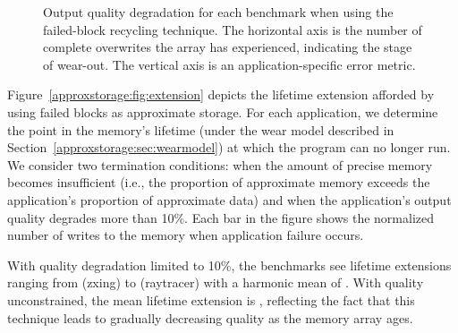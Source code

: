 \begin{figure}
    \centering
    \caption{
        Output quality degradation for each benchmark when using the
        failed-block recycling technique. The horizontal axis is the number of
        complete overwrites the array has experienced, indicating the stage of
        wear-out. The vertical axis is an application-specific error metric.
    }
\end{figure}

Figure~\ref{approxstorage:fig:extension} depicts the lifetime extension afforded by
using failed blocks as approximate storage. For
each application, we determine the point in the memory's lifetime
(under the wear model described in Section~\ref{approxstorage:sec:wearmodel}) at
which the program can no longer run. We consider two termination
conditions: when the amount of
precise memory becomes insufficient (i.e., the proportion of
approximate memory exceeds the application's proportion of approximate
data) and when the application's output quality degrades more than 10\%. Each bar in
the figure shows the normalized number of writes to the memory when
application failure occurs.

With quality degradation limited to 10\%, the benchmarks see lifetime
extensions ranging from  (\textsf{zxing}) to
 (\textsf{raytracer}) with
a harmonic mean of . With quality unconstrained, the mean lifetime
extension is , reflecting the fact that this technique leads to gradually
decreasing quality as the memory array ages.

